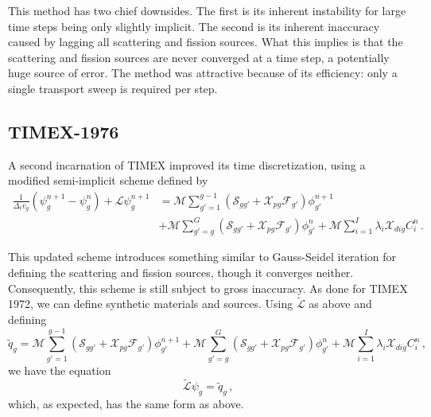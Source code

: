 This method has two chief downsides.  The first is its inherent
instability for large time steps being only slightly implicit.  
The second is its inherent inaccuracy caused by lagging all
scattering and fission sources.  What this implies is that the
scattering and fission sources are never converged at a time 
step, a potentially huge source of error.
The method was attractive because of its efficiency: only a 
single transport sweep is required per step.

\subsection{TIMEX-1976}

A second incarnation of TIMEX \cite{hill1976tim} 
improved its time discretization,
using a modified semi-implicit scheme defined by
\begin{equation}
\begin{split}
  \frac{1}{\Delta_t v_g} \left ( \psi^{n+1}_g - \psi^{n}_g \right )
     + \mathcal{L}\psi^{n+1}_g &= 
       \mathcal{M} \sum_{g'=1}^{g-1} 
         \left (
           \mathcal{S}_{gg'} + 
           \mathcal{X}_{pg} \mathcal{F}_{g'} 
         \right )\phi^{n+1}_{g'}  \\
    &+ \mathcal{M} \sum_{g'=g}^{G} 
         \left (
           \mathcal{S}_{gg'} + 
           \mathcal{X}_{pg} \mathcal{F}_{g'} 
         \right )\phi^{n}_{g'}
     +  \mathcal{M} \sum_{i=1}^{I} \lambda_i \mathcal{X}_{dig} C^{n}_i \, .
\end{split}
\label{timex1976}
\end{equation}
 
This updated scheme introduces something similar to 
Gauss-Seidel iteration for defining the scattering and
fission sources, though it converges neither.  Consequently, this
scheme is still subject to gross inaccuracy.  
As done for TIMEX 1972, we can define synthetic materials
and sources.  Using $\tilde{\mathcal{L}}$ as above and defining
\begin{equation}
 \tilde{q}_g =        \mathcal{M} \sum_{g'=1}^{g-1} 
         \left (
           \mathcal{S}_{gg'} + 
           \mathcal{X}_{pg} \mathcal{F}_{g'} 
         \right )\phi^{n+1}_{g'}  
     + \mathcal{M} \sum_{g'=g}^{G} 
         \left (
           \mathcal{S}_{gg'} + 
           \mathcal{X}_{pg} \mathcal{F}_{g'} 
         \right )\phi^{n}_{g'}
     +  \mathcal{M} \sum_{i=1}^{I} \lambda_i \mathcal{X}_{dig} C^{n}_i \, ,
\end{equation}
we have the equation
\begin{equation}
 \tilde{\mathcal{L}}\psi_g = \tilde{q}_g \, ,
\end{equation}
which, as expected, has the same form as above.

